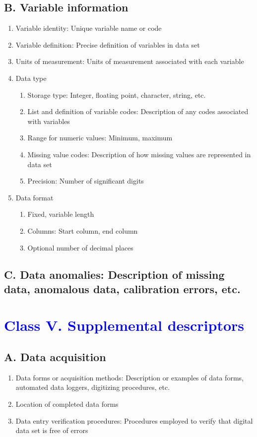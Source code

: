 \documentclass[a4paper,twoside,10pt]{article}
\begin{document}
    \subsection*{B. Variable information}
    \begin{enumerate}
    		\item Variable identity: Unique variable name or code
        \item Variable definition: Precise definition of variables in data set
        \item Units of measurement: Units of measurement associated with each variable
        \item Data type
        		\begin{enumerate}[label=\alph*.]
            		\item Storage type: Integer, floating point, character, string, etc.
            		\item List and definition of variable codes: Description of any codes associated with variables
            		\item Range for numeric values: Minimum, maximum
            		\item Missing value codes: Description of how missing values are represented in data set
            		\item Precision: Number of significant digits
            \end{enumerate}
        \item Data format
        		\begin{enumerate}[label=\alph*.]
        			\item Fixed, variable length
            		\item Columns: Start column, end column
            		\item Optional number of decimal places
        		\end{enumerate}
    \end{enumerate}
        
    \subsection*{C. Data anomalies: Description of missing data, anomalous data, calibration errors, etc.}
 \section*{\textcolor{Blue}{Class V. Supplemental descriptors}}
    \subsection*{A. Data acquisition}
    \begin{enumerate}
       \item Data forms or acquisition methods: Description or examples of data forms, automated data loggers, digitizing procedures, etc.
       \item Location of completed data forms
       \item Data entry verification procedures: Procedures employed to verify that digital data set is free of errors
    \end{enumerate}
\end{document}
